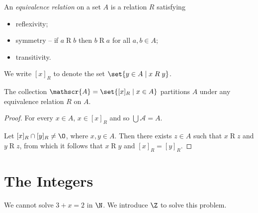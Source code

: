 \begin{definition}[Equivalence] \label{def:relations:equivalence}
    An \emph{equivalence relation} on a set $A$ is a relation $R$ satisfying
    \begin{itemize}
        \item reflexivity;
        \item symmetry -- if $a \mathrel{R} b$ then $b \mathrel{R} a$
            for all $a, b \in A$;
        \item transitivity.
    \end{itemize}
\end{definition}
\begin{notation}
    We write $[x]_R$ to denote the set $\set{y \in A \mid x \mathrel{R} y}$.
\end{notation}
\begin{proposition}
    The collection $\mathscr{A} = \set{[x]_R \mid x \in A}$ partitions $A$
    under any equivalence relation $R$ on $A$.
\end{proposition}
\begin{proof}
    For every $x \in A$, $x \in [x]_R$ and so $\bigcup \mathscr{A} = A$.

    Let $[x]_R \cap [y]_R \ne \O$, where $x, y \in A$.
    Then there exists $z \in A$ such that $x \mathrel{R} z$ and
    $y \mathrel{R} z$, from which it follows that $x \mathrel{R} y$ and
    $[x]_R = [y]_R$.
\end{proof}

\section{The Integers} \label{sec:integers}
We cannot solve $3 + x = 2$ in $\N$.
We introduce $\Z$ to solve this problem.


